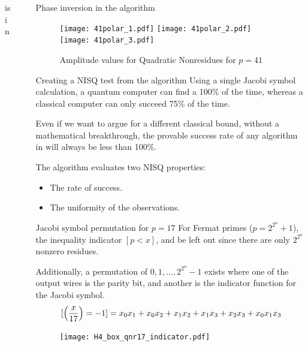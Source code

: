 \documentclass[final]{beamer}
\providecommand{\QNR}{\csword{QNR}}
\newlength{\sepwidth}
\newlength{\colwidth}
\newcommand{\separatorcolumn}{\begin{column}{\sepwidth}\end{column}}
\begin{document}
\begin{frame}[t]
\begin{columns}[t]
\begin{column}{\colwidth}
\begin{exampleblock}{\QNR is in \EQPC}
  \end{exampleblock}
\end{column}

\separatorcolumn

\begin{column}{\colwidth}

  \begin{block}{Phase inversion in the \QNR algorithm}
      \centering
    \begin{figure}
      \texttt{[image: 41polar\_1.pdf]}
    \hfill\texttt{[image: 41polar\_2.pdf]}
    \hfill\texttt{[image: 41polar\_3.pdf]}
      \caption{Amplitude values for Quadratic Nonresidues for $p=41$}
    \end{figure}

  \end{block}

  \begin{exampleblock}{Creating a NISQ test from the \QNR algorithm}
    Using a single Jacobi symbol calculation, a quantum computer can find a \QNR 100\% of the time, 
    whereas a classical computer can only succeed 75\% of the time.

    Even if we want to argue for a different classical bound, without a mathematical breakthrough,
    the provable success rate of any algorithm in \xP will always be less than 100\%.

    The \QNR algorithm evaluates two NISQ properties:
    \begin{itemize}
      \item The rate of success.
      \item The uniformity of the observations.
    \end{itemize}
  \end{exampleblock}

  \begin{block}{Jacobi symbol permutation for $p=17$}
  For Fermat primes ($p=2^{2^n}+1$), the inequality indicator $[p<x]$, and be left out since there are only $2^{2^n}$ nonzero residues.

    Additionally, a permutation of $0,1,\ldots ,2^{2^n}-1$ exists where one of the output wires is the parity bit, and another is the indicator function for the Jacobi symbol.
 $$[\left( \displaystyle\frac{x}{17} \right)=-1]=x_0x_1+x_0x_2+x_1x_2+x_1x_3+x_2x_3+x_0x_1x_3$$

 \begin{center}
    \begin{figure}
      \texttt{[image: H4\_box\_qnr17\_indicator.pdf]}
    \end{figure}
 \end{center}


\end{block}
\end{column}
\end{columns}
\end{frame}
\end{document}
